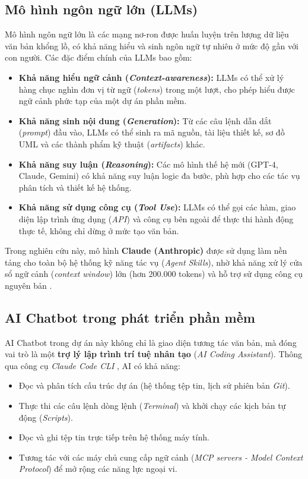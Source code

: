 \documentclass[13pt,a4paper,oneside]{extreport}
\numberwithin{equation}{chapter}
\numberwithin{figure}{chapter}
\numberwithin{table}{chapter}
\begin{document}
\subsection{Mô hình ngôn ngữ lớn (LLMs)}

Mô hình ngôn ngữ lớn là các mạng nơ-ron được huấn luyện trên lượng dữ liệu văn bản khổng lồ, có khả năng hiểu và sinh ngôn ngữ tự nhiên ở mức độ gần với con người. Các đặc điểm chính của LLMs bao gồm:

\begin{itemize}
    \item \textbf{Khả năng hiểu ngữ cảnh (\textit{Context-awareness}):} LLMs có thể xử lý hàng chục nghìn đơn vị từ ngữ (\textit{tokens}) trong một lượt, cho phép hiểu được ngữ cảnh phức tạp của một dự án phần mềm.
    \item \textbf{Khả năng sinh nội dung (\textit{Generation}):} Từ các câu lệnh dẫn dắt (\textit{prompt}) đầu vào, LLMs có thể sinh ra mã nguồn, tài liệu thiết kế, sơ đồ UML và các thành phẩm kỹ thuật (\textit{artifacts}) khác.
    \item \textbf{Khả năng suy luận (\textit{Reasoning}):} Các mô hình thế hệ mới (GPT-4, Claude, Gemini) có khả năng suy luận logic đa bước, phù hợp cho các tác vụ phân tích và thiết kế hệ thống.
    \item \textbf{Khả năng sử dụng công cụ (\textit{Tool Use}):} LLMs có thể gọi các hàm, giao diện lập trình ứng dụng (\textit{API}) và công cụ bên ngoài để thực thi hành động thực tế, không chỉ dừng ở mức tạo văn bản.
\end{itemize}

Trong nghiên cứu này, mô hình \textbf{Claude (Anthropic)} được sử dụng làm nền tảng cho toàn bộ hệ thống kỹ năng tác vụ (\textit{Agent Skills}), nhờ khả năng xử lý cửa sổ ngữ cảnh (\textit{context window}) lớn (hơn 200.000 tokens) và hỗ trợ sử dụng công cụ nguyên bản \cite{ref-anthropic}.

\subsection{AI Chatbot trong phát triển phần mềm}

AI Chatbot trong dự án này không chỉ là giao diện tương tác văn bản, mà đóng vai trò là một \textbf{trợ lý lập trình trí tuệ nhân tạo} (\textit{AI Coding Assistant}). Thông qua công cụ \textit{Claude Code CLI} \cite{ref-claude-code}, AI có khả năng:

\begin{itemize}
    \item Đọc và phân tích cấu trúc dự án (hệ thống tệp tin, lịch sử phiên bản \textit{Git}).
    \item Thực thi các câu lệnh dòng lệnh (\textit{Terminal}) và khởi chạy các kịch bản tự động (\textit{Scripts}).
    \item Đọc và ghi tệp tin trực tiếp trên hệ thống máy tính.
    \item Tương tác với các máy chủ cung cấp ngữ cảnh (\textit{MCP servers - Model Context Protocol}) để mở rộng các năng lực ngoại vi.
\end{itemize}
\end{document}
